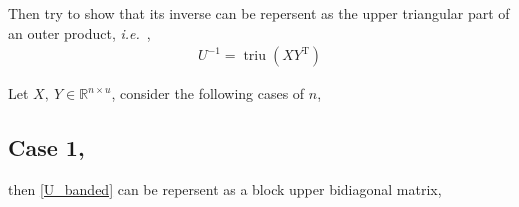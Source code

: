 \documentclass[11pt]{article}
\newcommand{\triu}{\mathop{\mathrm{triu}}}
\newcommand{\T}{\mathrm{T}}
\begin{document}
\noindent Then try to show that its inverse can be repersent as the upper triangular part of an outer product,
\textit{i.e.}\ ,
\begin{align}
    U^{-1} = \triu(XY^{\T}) \label{main_eqn}
\end{align}

\noindent Let $X,\ Y \in \mathbb{R}^{n \times u}$, consider the following cases of $n$,

\subsection*{Case 1, }

then \eqref{U_banded} can be repersent as a block upper bidiagonal matrix,


\setcounter{MaxMatrixCols}{30}
\end{document}
